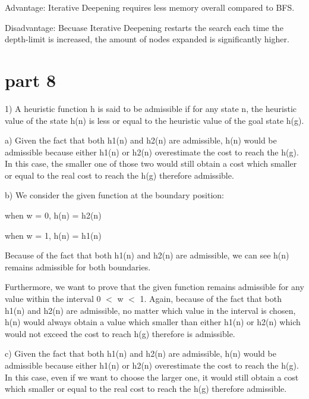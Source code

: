 \documentclass{article}
\begin{document}
\hspace{5mm}

Advantage: Iterative Deepening requires less memory overall compared to BFS.

Disadvantage: Becuase Iterative Deepening restarts the search each time the depth-limit is increased, the amount of nodes expanded is significantly higher.

\section*{part 8}

\hspace{5mm} 

1) A heuristic function h is said to be admissible if for any state n, the heuristic value of the state h{\small (n)} is less or equal to the heuristic value of the goal state h{\small (g)}.

a) Given the fact that both h{\small 1(n)} and h{\small 2(n)} are admissible, h{\small (n)} would be admissible because either h{\small 1(n)} or h{\small 2(n)} overestimate the cost to reach the h{\small (g)}. In this case, the smaller one of those two would still obtain a cost which smaller or equal to the real cost to reach the h{\small (g)} therefore admissible.

b) We consider the given function at the boundary position:
\begin{center}

when w = 0, h{\small(n)} = h{\small 2(n)}

when w = 1, h{\small(n)} = h{\small 1(n)}

\end{center}

Because of the fact that both h{\small 1(n)} and h{\small 2(n)} are admissible, we can see h{\small(n)} remains admissible for both boundaries.

Furthermore, we want to prove that the given function remains admissible for any value within the interval 0 $<$ w $<$ 1. Again, because of the fact that both h{\small 1(n)} and h{\small 2(n)} are admissible, no matter which value in the interval is chosen,  h{\small (n)} would always obtain a value which smaller than either h{\small 1(n)} or h{\small 2(n)} which would not exceed the cost to reach h{\small (g)} therefore is admissible.

c) Given the fact that both h{\small 1(n)} and h{\small 2(n)} are admissible, h{\small (n)} would be admissible because either h{\small 1(n)} or h{\small 2(n)} overestimate the cost to reach the h{\small (g)}. In this case, even if we want to choose the larger one, it would still obtain a cost which smaller or equal to the real cost to reach the h{\small (g)} therefore admissible.
\end{document}
